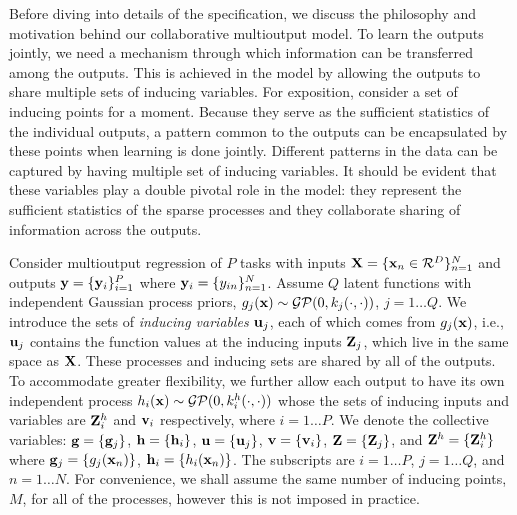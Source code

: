 Before diving into details of the specification, we discuss the philosophy and motivation behind our collaborative multioutput model.
To learn the outputs jointly, we need a mechanism through which information can be transferred among the outputs.
This is achieved in the model by allowing the outputs to share multiple sets of inducing variables.
For exposition, consider a set of inducing points for a moment.
Because they serve as the sufficient statistics of the individual outputs, a pattern common to the outputs can be encapsulated by these points when learning is done jointly. 
Different patterns in the data can be captured by having  multiple set of inducing variables.
It should be evident that these variables play a double pivotal role in the model: they represent the sufficient statistics of the sparse processes and they collaborate sharing of information across the outputs.

\newcommand{\Zj}{\Z_j}
\newcommand{\Zhi}{\Z^h_i}
Consider multioutput regression of $P$ tasks with inputs $\mathbf{X} = \{\mathbf{x}_n \in \mathcal{R}^D\}_{n=1}^N$ and outputs $\mathbf{y} = \{\mathbf{y}_i\}_{i=1}^P$ where $\mathbf{y}_i = \{y_{in}\}_{n=1}^N$. 
Assume $Q$ latent functions with independent Gaussian process priors, $g_j(\mathbf{x}) \sim \mathcal{GP}(0, k_j(\cdot,\cdot))$, $j= 1 \hdots Q$.
We introduce the sets of \emph{inducing variables} $\mathbf{u}_j$, each of which comes from $g_j(\mathbf{x})$, i.e., $\mathbf{u}_j$ contains the function values at the inducing inputs $\mathbf{Z}_j$, which live in the same space as $\mathbf{X}$.
These processes and inducing sets are shared by all of the outputs.
To accommodate greater flexibility, we further allow each output to have its own independent process $h_i(\mathbf{x}) \sim \mathcal{GP}(0, k^h_i(\cdot,\cdot))$ whose the sets of inducing inputs and variables are $\mathbf{Z}^h_i$ and $\mathbf{v}_i$ respectively, where $i = 1 \hdots P$.
We denote the collective variables: $\mathbf{g} = \{\mathbf{g}_j\}$, $\mathbf{h} = \{\mathbf{h}_i \}$, $\mathbf{u} = \{\mathbf{u}_j\}$, $\mathbf{v} = \{\mathbf{v}_i\}$, $\Z = \{\Zj\}$, and $\Z^h = \{\Zhi \}$ where $\mathbf{g}_j = \{g_j(\mathbf{x}_n)\}$, $\mathbf{h}_i = \{h_i(\mathbf{x}_n)\}$. 
The subscripts are $i = 1 \hdots P$, $j = 1 \hdots Q$, and $n = 1 \hdots N$.
For convenience, we shall assume the same number of inducing points, $M$, for all of the processes, however this is not imposed in practice.

